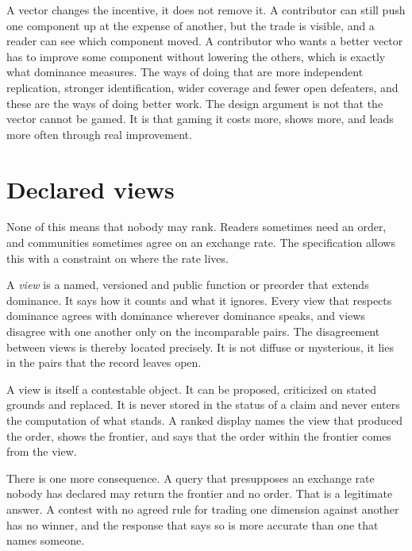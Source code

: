\documentclass[11pt]{article}
\begin{document}
A vector changes the incentive, it does not remove it. A contributor can still push one component up at the expense of another, but the trade is visible, and a reader can see which component moved. A contributor who wants a better vector has to improve some component without lowering the others, which is exactly what dominance measures. The ways of doing that are more independent replication, stronger identification, wider coverage and fewer open defeaters, and these are the ways of doing better work. The design argument is not that the vector cannot be gamed. It is that gaming it costs more, shows more, and leads more often through real improvement.

\section{Declared views}\label{sec:views}

None of this means that nobody may rank. Readers sometimes need an order, and communities sometimes agree on an exchange rate. The specification allows this with a constraint on where the rate lives.

A \emph{view} is a named, versioned and public function or preorder that extends dominance. It says how it counts and what it ignores. Every view that respects dominance agrees with dominance wherever dominance speaks, and views disagree with one another only on the incomparable pairs. The disagreement between views is thereby located precisely. It is not diffuse or mysterious, it lies in the pairs that the record leaves open.

A view is itself a contestable object. It can be proposed, criticized on stated grounds and replaced. It is never stored in the status of a claim and never enters the computation of what stands. A ranked display names the view that produced the order, shows the frontier, and says that the order within the frontier comes from the view.

There is one more consequence. A query that presupposes an exchange rate nobody has declared may return the frontier and no order. That is a legitimate answer. A contest with no agreed rule for trading one dimension against another has no winner, and the response that says so is more accurate than one that names someone.
\end{document}
